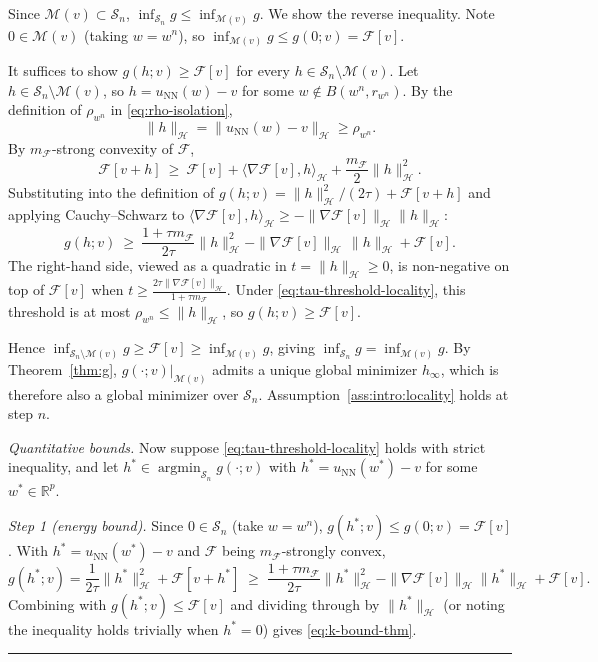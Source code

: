 \documentclass[twoside,11pt]{article}
\newcommand{\BlackBoxProof}{\rule{1.5ex}{1.5ex}}
\renewenvironment{proof}{\par\noindent{\bf Proof\ }}{\hfill\BlackBoxProof\par\medskip}
\newcommand{\R}{\mathbb{R}}
\newcommand{\NN}{\mathrm{NN}}
\newcommand{\argmin}{\mathop{\mathrm{arg min}}}
\newcommand{\calF}{\mathcal{F}}
\newcommand{\calH}{\mathcal{H}}
\newcommand{\calM}{\mathcal{M}}
\begin{document}
\begin{proof}
Since $\calM(v)\subset\mathcal{S}_n$, $\inf_{\mathcal{S}_n}g\le \inf_{\calM(v)}g$. We show the reverse inequality. Note $0\in\calM(v)$ (taking $w=w^n$), so $\inf_{\calM(v)}g\le g(0;v)=\calF[v]$.

It suffices to show $g(h;v)\ge \calF[v]$ for every $h\in\mathcal{S}_n\setminus\calM(v)$. Let $h\in\mathcal{S}_n\setminus\calM(v)$, so $h=u_\NN(w)-v$ for some $w\notin B(w^n,r_{w^n})$. By the definition of $\rho_{w^n}$ in \eqref{eq:rho-isolation},
\[
\|h\|_\calH=\|u_\NN(w)-v\|_\calH\ge \rho_{w^n}.
\]
By $m_\calF$-strong convexity of $\calF$,
\[
\calF[v+h]\ \ge\ \calF[v]+\langle\nabla\calF[v],h\rangle_\calH+\frac{m_\calF}{2}\|h\|_\calH^2.
\]
Substituting into the definition of $g(h;v)=\|h\|_\calH^2/(2\tau)+\calF[v+h]$ and applying Cauchy--Schwarz to $\langle\nabla\calF[v],h\rangle_\calH\ge -\|\nabla\calF[v]\|_\calH\|h\|_\calH$:
\begin{equation}\label{eq:g-quadratic-lower-bound}
g(h;v)\ \ge\ \frac{1+\tau m_\calF}{2\tau}\|h\|_\calH^2-\|\nabla\calF[v]\|_\calH\,\|h\|_\calH+\calF[v].
\end{equation}
The right-hand side, viewed as a quadratic in $t=\|h\|_\calH\ge 0$, is non-negative on top of $\calF[v]$ when $t\ge \frac{2\tau\|\nabla\calF[v]\|_\calH}{1+\tau m_\calF}$. Under \eqref{eq:tau-threshold-locality}, this threshold is at most $\rho_{w^n}\le \|h\|_\calH$, so $g(h;v)\ge \calF[v]$.

Hence $\inf_{\mathcal{S}_n\setminus\calM(v)}g\ge\calF[v]\ge\inf_{\calM(v)}g$, giving $\inf_{\mathcal{S}_n}g=\inf_{\calM(v)}g$. By Theorem~\ref{thm:g}, $g(\cdot;v)|_{\calM(v)}$ admits a unique global minimizer $h_\infty$, which is therefore also a global minimizer over $\mathcal{S}_n$. Assumption~\ref{ass:intro:locality} holds at step $n$.

\medskip
\noindent\emph{Quantitative bounds.}
Now suppose \eqref{eq:tau-threshold-locality} holds with strict inequality, and let $h^*\in\argmin_{\mathcal{S}_n}g(\cdot;v)$ with $h^*=u_\NN(w^*)-v$ for some $w^*\in\R^p$.

\emph{Step 1 (energy bound).}
Since $0\in\mathcal{S}_n$ (take $w=w^n$), $g(h^*;v)\le g(0;v)=\calF[v]$. With $h^*=u_\NN(w^*)-v$ and $\calF$ being $m_\calF$-strongly convex,
\[
g(h^*;v)
=\frac{1}{2\tau}\|h^*\|_\calH^2+\calF[v+h^*]
\;\ge\;\frac{1+\tau m_\calF}{2\tau}\|h^*\|_\calH^2-\|\nabla\calF[v]\|_\calH\|h^*\|_\calH+\calF[v].
\]
Combining with $g(h^*;v)\le\calF[v]$ and dividing through by $\|h^*\|_\calH$ (or noting the inequality holds trivially when $h^*=0$) gives \eqref{eq:k-bound-thm}.


\end{proof}
\end{document}
